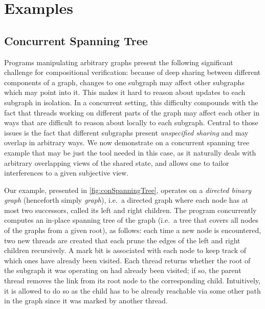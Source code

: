 \section{Examples}\label{sec:examples}



\subsection{Concurrent Spanning Tree}\label{subsec:CST-example}
Programs manipulating arbitrary graphs present the following significant
challenge for compositional verification: because of deep sharing
between different components of a graph, changes to one subgraph may
affect other subgraphs which may point into it. This makes it hard to
reason about updates to each subgraph in isolation. In a concurrent
setting, this difficulty compounds with the fact that threads working
on different parts of the graph may affect each other in ways that are
difficult to reason about locally to each subgraph. Central to those
issues is the fact that different subgraphs present \emph{unspecified
  sharing} and may overlap in arbitrary ways. We now demonstrate on a
concurrent spanning tree example that \colosl may be just the tool needed in this case, as it naturally deals with arbitrary overlapping
views of the shared state, and allows one to tailor interferences to a
given subjective view.

Our example, presented in \fig\ref{fig:conSpanningTree}, operates on a
\emph{directed binary graph} (henceforth simply \emph{graph}),
i.e.\ a directed graph where each node has at most two
successors, called its left and right children. The program concurrently computes an
in-place spanning tree of the graph (i.e.\ a tree that covers
all nodes of the graphs from a given root), as follows:
each time a new node is encountered, two new threads are created that
each prune the edges of the left and right children recursively. A
mark bit is associated with each node to keep track of which ones have
already been visited. Each thread returns whether the root
of the subgraph it was operating on had already been visited; if so,
the parent thread removes the link from its root node to the
corresponding child. Intuitively, it is allowed to do so as the child has to be
already reachable via some other path in the graph since it was marked by another thread.


